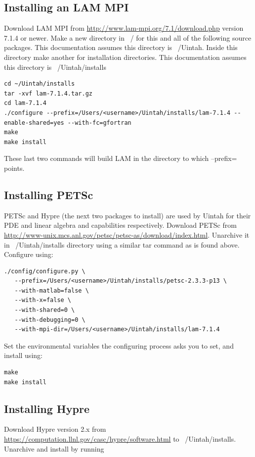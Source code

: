 \documentclass[12pt]{article}
\begin{document}
\subsection{Installing an LAM MPI}
Download LAM MPI from \url{http://www.lam-mpi.org/7.1/download.php} version 7.1.4 or newer.  Make a new directory in ~/ for this and all of the following source packages.  This documentation assumes this directory is ~/Uintah.  Inside this directory make another for installation directories.  This documentation assumes this directory is ~/Uintah/installs

\begin{verbatim}
cd ~/Uintah/installs
tar -xvf lam-7.1.4.tar.gz
cd lam-7.1.4
./configure --prefix=/Users/<username>/Uintah/installs/lam-7.1.4 --enable-shared=yes --with-fc=gfortran
make
make install
\end{verbatim}

These last two commands will build LAM in the directory to which --prefix= points.

\subsection{Installing PETSc}
PETSc and Hypre (the next two packages to install) are used by Uintah for their PDE and linear algebra and capabilities respectively.
Download PETSc from \url{http://www-unix.mcs.anl.gov/petsc/petsc-as/download/index.html}.  Unarchive it in ~/Uintah/installs directory using a similar tar command as is found above.  Configure using:

\begin{verbatim}
./config/configure.py \
   --prefix=/Users/<username>/Uintah/installs/petsc-2.3.3-p13 \
   --with-matlab=false \
   --with-x=false \
   --with-shared=0 \
   --with-debugging=0 \
   --with-mpi-dir=/Users/<username>/Uintah/installs/lam-7.1.4
\end{verbatim}

Set the environmental variables the configuring process asks you to set, and install using:

\begin{verbatim}
make
make install
\end{verbatim}

\subsection{Installing Hypre}
Download Hypre version 2.x from \url{https://computation.llnl.gov/casc/hypre/software.html} to ~/Uintah/installs.  Unarchive and install by running
\end{document}
